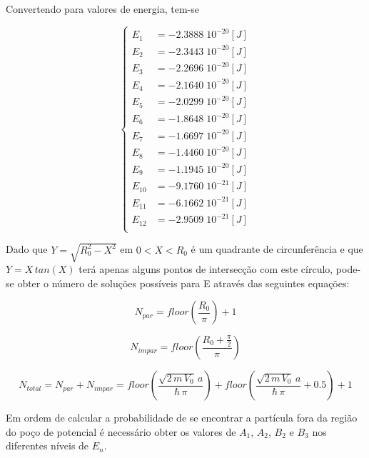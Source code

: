 \noindent Convertendo para valores de energia, tem-se

\begin{equation}
	\begin{cases}
		E_{1}  & = -2.3888\;10^{-20} [J] \\
		E_{2}  & = -2.3443\;10^{-20} [J] \\
		E_{3}  & = -2.2696\;10^{-20} [J] \\
		E_{4}  & = -2.1640\;10^{-20} [J] \\
		E_{5}  & = -2.0299\;10^{-20} [J] \\
		E_{6}  & = -1.8648\;10^{-20} [J] \\
		E_{7}  & = -1.6697\;10^{-20} [J] \\
		E_{8}  & = -1.4460\;10^{-20} [J] \\
		E_{9}  & = -1.1945\;10^{-20} [J] \\
		E_{10} & = -9.1760\;10^{-21} [J] \\
		E_{11} & = -6.1662\;10^{-21} [J] \\
		E_{12} & = -2.9509\;10^{-21} [J] \\
	\end{cases}
\end{equation}

Dado que $Y=\sqrt{R_0^2-X^2}$ em $0<X<R_0$ é um quadrante de circunferência
e que $Y=X\,tan(X)$ terá apenas alguns pontos de intersecção com este círculo,
pode-se obter o número de soluções possíveis para E através das seguintes
equações:

\begin{equation}
	N_{par} = floor\left(\frac{R_0}{\pi}\right)+1
\end{equation}

\begin{equation}
	N_{impar} = floor\left(\frac{R_0 + \frac{\pi}{2} }{\pi}\right)
\end{equation}

\begin{equation}
	N_{total} = N_{par} + N_{impar}
	= floor\left(\frac{\sqrt{2\,m\,V_0}\,a}{\hbar\,\pi}\right)
	+ floor\left(\frac{\sqrt{2\,m\,V_0}\,a}{\hbar\,\pi} + 0.5\right) + 1
\end{equation}

Em ordem de calcular a probabilidade de se encontrar a partícula fora da região
do poço de potencial é necessário obter os valores de $A_1$, $A_2$, $B_2$
e $B_3$ nos diferentes níveis de $E_n$.
